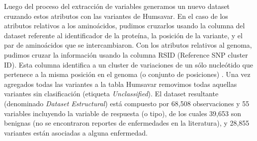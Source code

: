 Luego del proceso del extracción de variables generamos un nuevo dataset cruzando estos atributos con las variantes de Humsavar. En el caso de los atributos relativos a los aminoácidos, pudimos cruzarlos usando la columna del dataset referente al identificador de la proteína, la posición de la variante, y el par de aminoácidos que se intercambiaron. Con los atributos relativos al genoma, pudimos cruzar la información usando la columna RSID (Reference SNP cluster ID). Esta columna identifica a un cluster de variaciones de un sólo nucleótido que pertenece a la misma posición en el genoma (o conjunto de posiciones) \cite{Ostell2007}. Una vez agregados todas las variantes a la tabla Humsavar removimos todas aquellas variantes sin clasificación (etiqueta \textit{Unclassified}). 
El dataset resultante (denominado \textit{Dataset Estructural}) está compuesto por 68,508 observaciones y 55 variables incluyendo la variable de respuesta (o tipo), de los cuales 39,653 son benignas (no se encontraron reportes de enfermedades en la literatura), y 28,855 variantes están asociadas a alguna enfermedad. 

